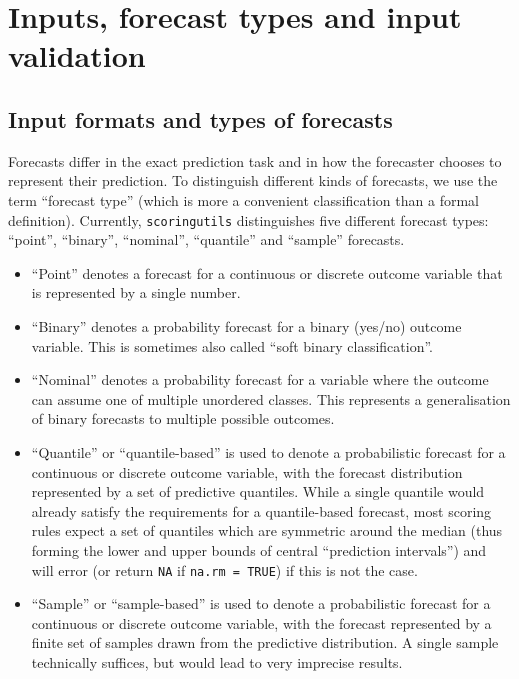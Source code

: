 \documentclass[
]{jss}
\providecommand{\tightlist}{%
  \setlength{\itemsep}{0pt}\setlength{\parskip}{0pt}}
\begin{document}
\section{Inputs, forecast types and input validation} \label{sec:inputs}

\subsection{Input formats and types of
forecasts}\label{input-formats-and-types-of-forecasts}

Forecasts differ in the exact prediction task and in how the forecaster
chooses to represent their prediction. To distinguish different kinds of
forecasts, we use the term ``forecast type'' (which is more a convenient
classification than a formal definition). Currently,
\texttt{scoringutils} distinguishes five different forecast types:
``point'', ``binary'', ``nominal'', ``quantile'' and ``sample''
forecasts.

\begin{itemize}
\tightlist
\item
  ``Point'' denotes a forecast for a continuous or discrete outcome
  variable that is represented by a single number.
\item
  ``Binary'' denotes a probability forecast for a binary (yes/no)
  outcome variable. This is sometimes also called ``soft binary
  classification''.
\item
  ``Nominal'' denotes a probability forecast for a variable where the
  outcome can assume one of multiple unordered classes. This represents
  a generalisation of binary forecasts to multiple possible outcomes.
\item
  ``Quantile'' or ``quantile-based'' is used to denote a probabilistic
  forecast for a continuous or discrete outcome variable, with the
  forecast distribution represented by a set of predictive quantiles.
  While a single quantile would already satisfy the requirements for a
  quantile-based forecast, most scoring rules expect a set of quantiles
  which are symmetric around the median (thus forming the lower and
  upper bounds of central ``prediction intervals'') and will error (or
  return \texttt{NA} if \texttt{na.rm\ =\ TRUE}) if this is not the
  case.
\item
  ``Sample'' or ``sample-based'' is used to denote a probabilistic
  forecast for a continuous or discrete outcome variable, with the
  forecast represented by a finite set of samples drawn from the
  predictive distribution. A single sample technically suffices, but
  would lead to very imprecise results.
\end{itemize}
\end{document}
